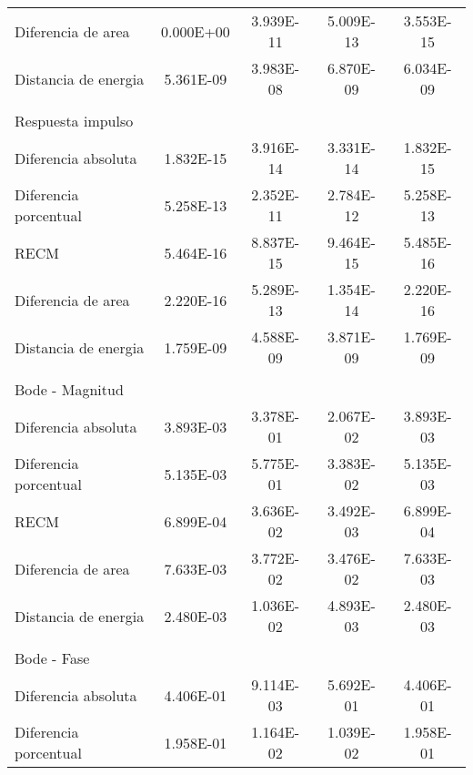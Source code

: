 {\begin{longtable}{l @{\extracolsep{\fill}} cccc}
            Diferencia de area     & \num{0.000E+00} & \num{3.939E-11} & \num{5.009E-13} & \num{3.553E-15}  \\
            Distancia de energia   & \num{5.361E-09} & \num{3.983E-08} & \num{6.870E-09} & \num{6.034E-09}  \\
            & & & & \\
            Respuesta impulso      & & & & \\ \cmidrule{1-1}
            Diferencia absoluta    & \num{1.832E-15} & \num{3.916E-14} & \num{3.331E-14} & \num{1.832E-15}  \\
            Diferencia porcentual  & \num{5.258E-13} & \num{2.352E-11} & \num{2.784E-12} & \num{5.258E-13}  \\
            RECM                   & \num{5.464E-16} & \num{8.837E-15} & \num{9.464E-15} & \num{5.485E-16}  \\
            Diferencia de area     & \num{2.220E-16} & \num{5.289E-13} & \num{1.354E-14} & \num{2.220E-16}  \\
            Distancia de energia   & \num{1.759E-09} & \num{4.588E-09} & \num{3.871E-09} & \num{1.769E-09}  \\
            & & & & \\
            Bode - Magnitud        & & & & \\ \cmidrule{1-1}
            Diferencia absoluta    & \num{3.893E-03} & \num{3.378E-01} & \num{2.067E-02} & \num{3.893E-03}  \\
            Diferencia porcentual  & \num{5.135E-03} & \num{5.775E-01} & \num{3.383E-02} & \num{5.135E-03}  \\
            RECM                   & \num{6.899E-04} & \num{3.636E-02} & \num{3.492E-03} & \num{6.899E-04}  \\
            Diferencia de area     & \num{7.633E-03} & \num{3.772E-02} & \num{3.476E-02} & \num{7.633E-03}  \\
            Distancia de energia   & \num{2.480E-03} & \num{1.036E-02} & \num{4.893E-03} & \num{2.480E-03}  \\
            & & & & \\
            Bode - Fase            & & & & \\ \cmidrule{1-1}
            Diferencia absoluta    & \num{4.406E-01} & \num{9.114E-03} & \num{5.692E-01} & \num{4.406E-01}  \\
            Diferencia porcentual  & \num{1.958E-01} & \num{1.164E-02} & \num{1.039E-02} & \num{1.958E-01}  \\

\end{longtable}}

